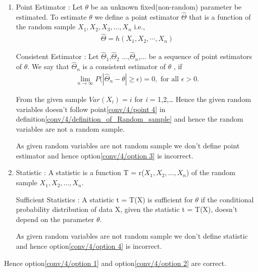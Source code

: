 \begin{enumerate}
   \item
   \begin{definition}
   
     Point Estimator : Let $\theta$ be an unknown fixed(non-random) parameter be estimated. To estimate $\theta$ we define a point estimator $\hat{\Theta}$ that is a function of the random sample  $X_{1},X_{2},X_{3},\dots,X_{n}$ i.e.,
     \begin{align}
       \hat{\Theta}=h(X_1,X_2,\cdots,X_n)
   \end{align}
   
   \end{definition}
   
   \begin{definition}
     Consistent Estimator : Let $\hat{\Theta}_1$,$\hat{\Theta}_2$ $\dots$,$\hat{\Theta}_n$,$\dots$ be a sequence of point estimators of $\theta$. We say that $\hat{\Theta}_n$ is a consistent estimator of $\theta$ , if 
   \begin{align} \label{conv/4/consistent estimator definition}
       \lim_{n \rightarrow \infty} P\big(|\hat{\Theta}_n-\theta| \geq \epsilon \big)=0, \textrm{ for all }\epsilon>0.
   \end{align}
   \end{definition}
   From the given sample $Var(X_{i}) = i$ for \textit{i} = 1,2,\dots
   Hence the given random variables doesn't follow point\eqref{conv/4/point 4} in  definition\eqref{conv/4/definition_of_Random_sample} and hence the random variables are not a random sample.
  
   As given random variables are not random sample we don't define point estimator and hence option\eqref{conv/4/option 3} is incorrect.
   
   \item
   \begin{definition}
     Statistic : A statistic is a function T = r($X_{1},X_{2},\dots,X_{n}$) of the random sample $X_{1},X_{2},\dots,X_{n}$.
   \end{definition}
   \begin{definition}
    Sufficient Statistics : A statistic t = T(X) is sufficient for $\theta$ if the conditional probability distribution of data X, given the statistic t = T(X), doesn't depend on the parameter $\theta$.
   \end{definition}
   As given random variables are not random sample we don't define statistic and hence option\eqref{conv/4/option 4} is incorrect.
\end{enumerate}
Hence option\eqref{conv/4/option 1} and option\eqref{conv/4/option 2} are correct.